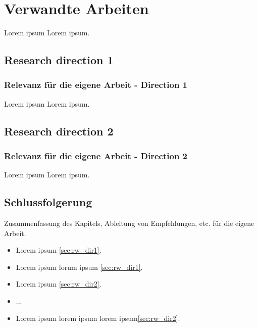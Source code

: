 \section{Verwandte Arbeiten}\label{sec:RelatedWork}

Lorem ipsum Lorem ipsum.


\subsection{Research direction 1} \label{sec:rw_dir1}



\subsubsection{Relevanz für die eigene Arbeit - Direction 1}

Lorem ipsum Lorem ipsum.


\subsection{Research direction 2} \label{sec:rw_dir2}


\subsubsection{Relevanz für die eigene Arbeit - Direction 2}

Lorem ipsum Lorem ipsum.


\subsection{Schlussfolgerung}
Zusammenfassung des Kapitels, Ableitung von Empfehlungen, etc. für die eigene Arbeit.

\begin{itemize}
	\item Lorem ipsum \autoref{sec:rw_dir1}.
	\item Lorem ipsum lorum ipsum \autoref{sec:rw_dir1}.
	\item Lorem ipsum \autoref{sec:rw_dir2}.
	\item ...
	\item Lorem ipsum lorem ipsum lorem ipsum\autoref{sec:rw_dir2}.
\end{itemize}